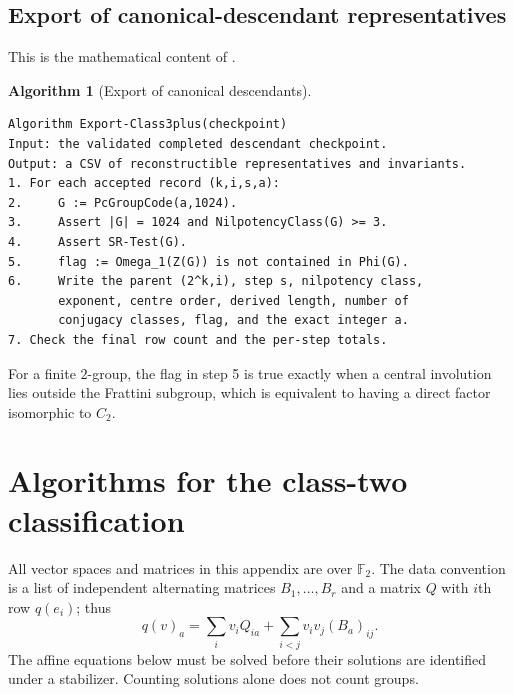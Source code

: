 \documentclass[11pt,a4paper]{amsart}
\theoremstyle{definition}
\newtheorem{algorithm}{Algorithm}
\theoremstyle{remark}
\numberwithin{equation}{section}
\begin{document}
\subsection{Export of canonical-descendant representatives}
This is the mathematical content of .
\par\noindent\begin{minipage}{\linewidth}
\begin{algorithm}[Export of canonical descendants]\label{alg:exportdescendants}
\leavevmode\par
\begin{lstlisting}
Algorithm Export-Class3plus(checkpoint)
Input: the validated completed descendant checkpoint.
Output: a CSV of reconstructible representatives and invariants.
1. For each accepted record (k,i,s,a):
2.     G := PcGroupCode(a,1024).
3.     Assert |G| = 1024 and NilpotencyClass(G) >= 3.
4.     Assert SR-Test(G).
5.     flag := Omega_1(Z(G)) is not contained in Phi(G).
6.     Write the parent (2^k,i), step s, nilpotency class,
       exponent, centre order, derived length, number of
       conjugacy classes, flag, and the exact integer a.
7. Check the final row count and the per-step totals.
\end{lstlisting}
\end{algorithm}
\end{minipage}\par\medskip
For a finite $2$-group, the flag in step 5 is true exactly when
a central involution lies outside the Frattini subgroup, which
is equivalent to having a direct factor isomorphic to $C_2$.

\section{Algorithms for the class-two classification}\label{app:class2-algorithms}
All vector spaces and matrices in this appendix are over $\mathbb F_2$.
The data convention is a list of independent alternating matrices
$B_1,\ldots,B_r$ and a matrix $Q$ with $i$th row $q(e_i)$; thus
\[
 q(v)_a=\sum_i v_iQ_{ia}+\sum_{i<j}v_iv_j(B_a)_{ij}.
\]
The affine equations below must be solved before their solutions are
identified under a stabilizer. Counting solutions alone does not count groups.
\end{document}
